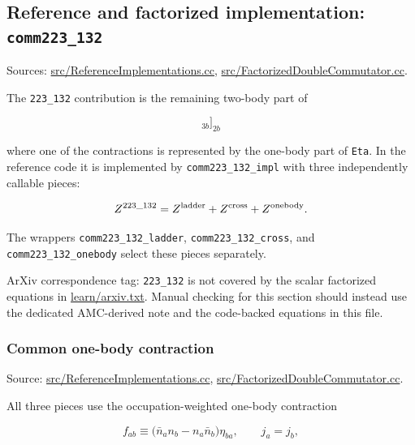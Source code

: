 \documentclass[
]{article}
\begin{document}
\subsection{\texorpdfstring{Reference and factorized implementation:
\texttt{comm223\_132}}{Reference and factorized implementation: comm223\_132}}\label{reference-and-factorized-implementation-comm223_132}

Sources:
\href{../src/ReferenceImplementations.cc\#L13338-L13799}{src/ReferenceImplementations.cc},
\href{../src/FactorizedDoubleCommutator.cc\#L3051-L3565}{src/FactorizedDoubleCommutator.cc}.

The \texttt{223\_132} contribution is the remaining two-body part of

\begin{equation}
[\eta_2,[\eta_2,\Gamma_2]_{3b}]_{2b}
\end{equation}

where one of the contractions is represented by the one-body part of
\texttt{Eta}. In the reference code it is implemented by
\texttt{comm223\_132\_impl} with three independently callable pieces:

\begin{equation}
Z^{223\_132}=Z^{\rm ladder}+Z^{\rm cross}+Z^{\rm onebody}.
\end{equation}

The wrappers \texttt{comm223\_132\_ladder},
\texttt{comm223\_132\_cross}, and \texttt{comm223\_132\_onebody} select
these pieces separately.

ArXiv correspondence tag: \texttt{223\_132} is not covered by the scalar
factorized equations in \href{./arxiv.txt}{learn/arxiv.txt}. Manual
checking for this section should instead use the dedicated AMC-derived
note and the code-backed equations in this file.

\subsubsection{Common one-body
contraction}\label{common-one-body-contraction}

Source:
\href{../src/ReferenceImplementations.cc\#L13377-L13403}{src/ReferenceImplementations.cc},
\href{../src/FactorizedDoubleCommutator.cc\#L3114-L3131}{src/FactorizedDoubleCommutator.cc}.

All three pieces use the occupation-weighted one-body contraction

\begin{equation}
f_{ab}\equiv \big(\bar n_a n_b-n_a\bar n_b\big)\eta_{ba},
\qquad j_a=j_b,
\end{equation}
\end{document}
